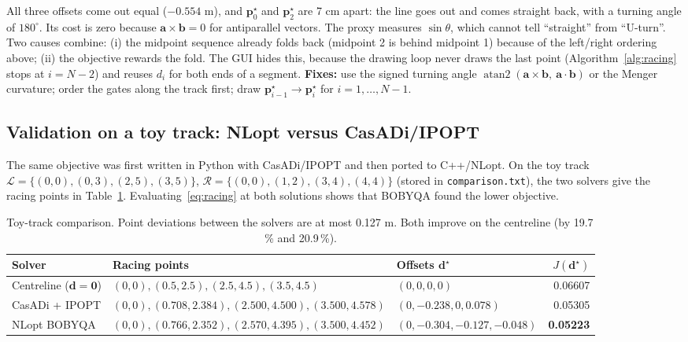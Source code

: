 \documentclass[10pt,a4paper]{scrartcl}
\renewcommand{\emph}[1]{\textcolor{accent}{#1}}
\newcommand{\file}[1]{\texttt{\small #1}}
\DeclareMathOperator{\atantwo}{atan2}
\begin{document}
  \begin{warnbox}
  \small
  All three offsets come out equal ($-0.554$ m), and $\bm p_0^\star$ and $\bm p_2^\star$
  are 7 cm apart: the line goes out and comes straight back, with a turning angle of
  $180^\circ$. Its cost is zero because $\bm a\times\bm b=0$ for antiparallel vectors.
  The proxy measures $\sin\theta$, which cannot tell ``straight'' from ``U-turn''. Two
  causes combine: (i) the midpoint sequence already folds back (midpoint 2 is behind
  midpoint 1) because of the left/right ordering above; (ii) the objective rewards the
  fold. The GUI hides this, because the drawing loop never draws the last point
  (Algorithm~\ref{alg:racing} stops at $i=N-2$) and reuses $d_i$ for both ends of a segment.
  \textbf{Fixes:} use the signed turning angle $\atantwo(\bm a\times\bm b,\ \bm a\cdot\bm b)$
  or the Menger curvature; order the gates along the track first; draw
  $\bm p_{i-1}^\star\to\bm p_i^\star$ for $i=1,\dots,N-1$.
  \end{warnbox}

  \subsection{Validation on a toy track: NLopt versus CasADi/IPOPT}

  The same objective was first written in Python with CasADi/IPOPT and then ported to
  C++/NLopt. On the toy track
  $\mathcal L=\{(0,0),(0,3),(2,5),(3,5)\}$, $\mathcal R=\{(0,0),(1,2),(3,4),(4,4)\}$
  (stored in \file{comparison.txt}), the two solvers give the racing points in
  Table~\ref{tab:toy}. Evaluating~\eqref{eq:racing} at both solutions shows that
  \emph{BOBYQA found the lower objective}.

  \begin{table}[H]
  \small
  \centering
  \renewcommand{\arraystretch}{1.05}
  \begin{tabular}{@{}lllr@{}}
  \toprule
  \textbf{Solver} & \textbf{Racing points} & \textbf{Offsets} $\bm d^\star$ & $J(\bm d^\star)$ \\
  \midrule
  Centreline ($\bm d=\bm 0$) & $(0,0),(0.5,2.5),(2.5,4.5),(3.5,4.5)$ & $(0,0,0,0)$ & 0.06607 \\
  CasADi + IPOPT & $(0,0),(0.708,2.384),(2.500,4.500),(3.500,4.578)$ & $(0,-0.238,0,0.078)$ & 0.05305 \\
  NLopt BOBYQA & $(0,0),(0.766,2.352),(2.570,4.395),(3.500,4.452)$ & $(0,-0.304,-0.127,-0.048)$ & \textbf{0.05223} \\
  \bottomrule
  \end{tabular}
  \caption{Toy-track comparison. Point deviations between the solvers are at most
  0.127 m. Both improve on the centreline (by 19.7\,\% and 20.9\,\%).}
  \label{tab:toy}
  \end{table}
\end{document}
